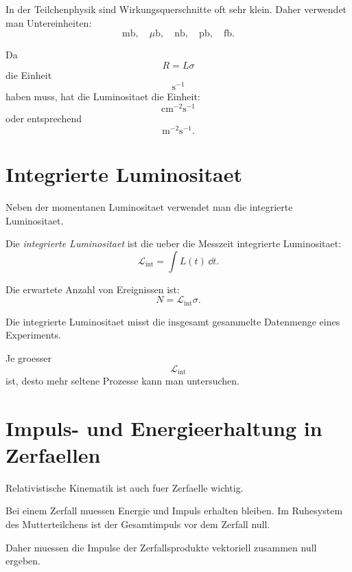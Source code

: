 \begin{conceptbox}
In der Teilchenphysik sind Wirkungsquerschnitte oft sehr klein.
Daher verwendet man Untereinheiten:
\[
    \mathrm{mb},\quad \mu\mathrm{b},\quad \mathrm{nb},\quad \mathrm{pb},\quad \mathrm{fb}.
\]
\end{conceptbox}

\begin{formulabox}
Da
\[
    R=L\sigma
\]
die Einheit
\[
    \mathrm{s}^{-1}
\]
haben muss, hat die Luminositaet die Einheit:
\[
    \mathrm{cm}^{-2}\mathrm{s}^{-1}
\]
oder entsprechend
\[
    \mathrm{m}^{-2}\mathrm{s}^{-1}.
\]
\end{formulabox}

\section{Integrierte Luminositaet}

Neben der momentanen Luminositaet verwendet man die integrierte Luminositaet.

\begin{definitionbox}
Die \emph{integrierte Luminositaet} ist die ueber die Messzeit integrierte
Luminositaet:
\[
    \mathcal{L}_{\mathrm{int}}
    =
    \int L(t)\,\dd t.
\]
\end{definitionbox}

\begin{formulabox}
Die erwartete Anzahl von Ereignissen ist:
\[
    N
    =
    \mathcal{L}_{\mathrm{int}}\sigma.
\]
\end{formulabox}

\begin{conceptbox}
Die integrierte Luminositaet misst die insgesamt gesammelte Datenmenge eines
Experiments.

Je groesser
\[
    \mathcal{L}_{\mathrm{int}}
\]
ist, desto mehr seltene Prozesse kann man untersuchen.
\end{conceptbox}

\section{Impuls- und Energieerhaltung in Zerfaellen}

Relativistische Kinematik ist auch fuer Zerfaelle wichtig.

\begin{conceptbox}
Bei einem Zerfall muessen Energie und Impuls erhalten bleiben.
Im Ruhesystem des Mutterteilchens ist der Gesamtimpuls vor dem Zerfall null.

Daher muessen die Impulse der Zerfallsprodukte vektoriell zusammen null ergeben.
\end{conceptbox}

